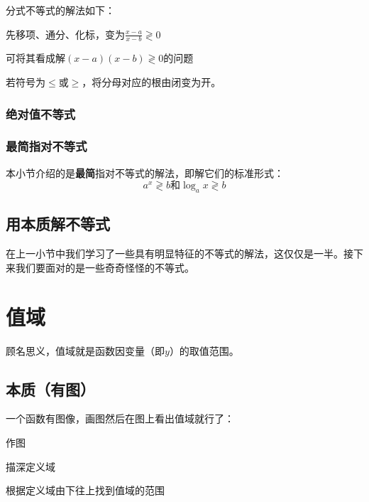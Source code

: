 分式不等式的解法如下：

\begin{enumlist}
	\item 先移项、通分、化标，变为$\frac{x-a}{x-b}\gtrless0$
	\item 可将其看成解$(x-a)(x-b)\gtrless0$的问题
\end{enumlist}

若符号为$\leq$或$\geq$，将分母对应的根由闭变为开。

\subsubsection{绝对值不等式}

\subsubsection{最简指对不等式}
本小节介绍的是\textbf{最简}指对不等式的解法，即解它们的标准形式：\[a^x\gtrless b\text{和}\log_ax\gtrless b\]

\subsection[本质]{用本质解不等式}
在上一小节中我们学习了一些具有明显特征的不等式的解法，这仅仅是一半。接下来我们要面对的是一些奇奇怪怪的不等式。

\section{值域}
顾名思义，值域就是函数因变量（即$y$）的取值范围。

\subsection[本质]{本质（有图）}
一个函数有图像，画图然后在图上看出值域就行了：

\begin{enumlist}
\item 作图
\item 描深定义域
\item 根据定义域由下往上找到值域的范围
\end{enumlist}

